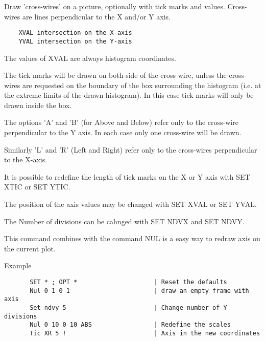    \par
Draw 'cross-wires' on a picture, optionally with tick marks and values.  
   Cross-wires are lines perpendicular to the X and/or Y axis.  
\begin{verbatim}
    XVAL intersection on the X-axis
    YVAL intersection on the Y-axis
\end{verbatim}
   \par
The values of XVAL are always histogram coordinates.  

   \par
The tick marks will be drawn on both side of the cross wire, unless the 
   cross-wires are requested on the boundary of the box surrounding the 
   histogram (i.e. at the extreme limits of the drawn histogram). In this case 
   tick marks will only be drawn inside the box.  

   \par
The options 'A' and 'B' (for Above and Below) refer only to the cross-wire 
   perpendicular to the Y axis.  In each case only one cross-wire will be 
   drawn.  

   \par
Similarly 'L' and 'R' (Left and Right) refer only to the cross-wires 
   perpendicular to the X-axis.  

   \par
It is possible to redefine the length of tick marks on the X or Y axis with 
   SET XTIC or SET YTIC.  

   \par
The position of the axis values may be changed with SET XVAL or SET YVAL.  

   \par
The Number of divisions can be cahnged with SET NDVX and SET NDVY.  

   \par
This command combines with the command NUL is a easy way to redraw axis on 
   the current plot.  

   \par
Example 
\begin{verbatim}
       SET * ; OPT *                     | Reset the defaults
       Nul 0 1 0 1                       | draw an empty frame with axis
       Set ndvy 5                        | Change number of Y divisions
       Nul 0 10 0 10 ABS                 | Redefine the scales
       Tic XR 5 !                        | Axis in the new coordinates
\end{verbatim}

\ENDCMD

